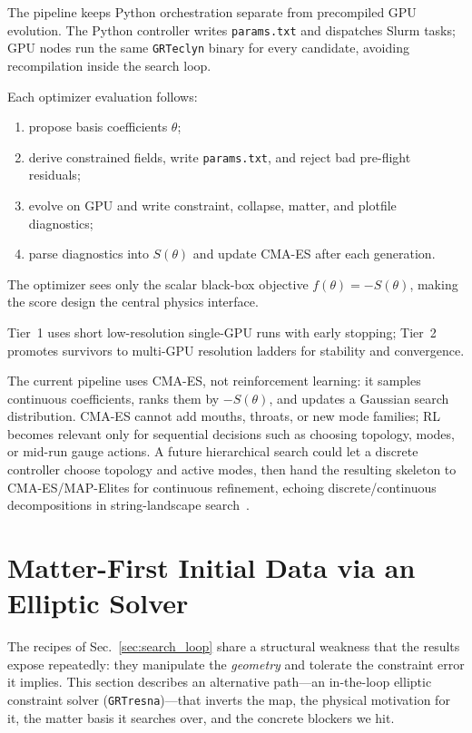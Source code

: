 \documentclass[twocolumn,floatfix,aps,prd,nofootinbib]{revtex4-2}
\begin{document}
The pipeline keeps Python orchestration separate from precompiled GPU evolution.  The Python controller writes \texttt{params.txt} and dispatches Slurm tasks; GPU nodes run the same \texttt{GRTeclyn} binary for every candidate, avoiding recompilation inside the search loop.

Each optimizer evaluation follows:
\begin{enumerate}
    \item propose basis coefficients $\theta$;
    \item derive constrained fields, write \texttt{params.txt}, and reject bad pre-flight residuals;
    \item evolve on GPU and write constraint, collapse, matter, and plotfile diagnostics;
    \item parse diagnostics into $S(\theta)$ and update CMA-ES after each generation.
\end{enumerate}
The optimizer sees only the scalar black-box objective $f(\theta)=-S(\theta)$, making the score design the central physics interface.

Tier~1 uses short low-resolution single-GPU runs with early stopping; Tier~2 promotes survivors to multi-GPU resolution ladders for stability and convergence.

The current pipeline uses CMA-ES, not reinforcement learning: it samples continuous coefficients, ranks them by $-S(\theta)$, and updates a Gaussian search distribution.  CMA-ES cannot add mouths, throats, or new mode families; RL becomes relevant only for sequential decisions such as choosing topology, modes, or mid-run gauge actions.  A future hierarchical search could let a discrete controller choose topology and active modes, then hand the resulting skeleton to CMA-ES/MAP-Elites for continuous refinement, echoing discrete/continuous decompositions in string-landscape search~\cite{halverson2019branes}.

\section{Matter-First Initial Data via an Elliptic Solver}
\label{sec:grtresna}

The recipes of Sec.~\ref{sec:search_loop} share a structural weakness that the
results expose repeatedly: they manipulate the \emph{geometry} and tolerate the
constraint error it implies.  This section describes an alternative path---an
in-the-loop elliptic constraint solver (\texttt{GRTresna})---that inverts the
map, the physical motivation for it, the matter basis it searches over, and the
concrete blockers we hit.
\end{document}
